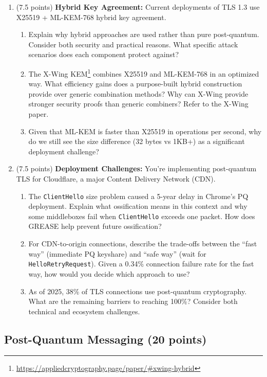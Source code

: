 \documentclass[10pt,a4paper,american]{exam}
\begin{document}
\begin{enumerate}
	\item (7.5 points) \textbf{Hybrid Key Agreement:}
	      Current deployments of TLS 1.3 use X25519 + ML-KEM-768 hybrid key agreement.
	      \begin{enumerate}
		      \item Explain why hybrid approaches are used rather than pure post-quantum. Consider both security and practical reasons. What specific attack scenarios does each component protect against?
		      \item The X-Wing KEM\footnote{\url{https://appliedcryptography.page/paper/\#xwing-hybrid}} combines X25519 and ML-KEM-768 in an optimized way. What efficiency gains does a purpose-built hybrid construction provide over generic combination methods? Why can X-Wing provide stronger security proofs than generic combiners? Refer to the X-Wing paper.
		      \item Given that ML-KEM is faster than X25519 in operations per second, why do we still see the size difference (32 bytes vs 1KB+) as a significant deployment challenge?
	      \end{enumerate}
	\item (7.5 points) \textbf{Deployment Challenges:}
	      You're implementing post-quantum TLS for Cloudflare, a major Content Delivery Network (CDN).
	      \begin{enumerate}
		      \item The \texttt{ClientHello} size problem caused a 5-year delay in Chrome's PQ deployment. Explain what ossification means in this context and why some middleboxes fail when \texttt{ClientHello} exceeds one packet. How does GREASE help prevent future ossification?
		      \item For CDN-to-origin connections, describe the trade-offs between the ``fast way'' (immediate PQ keyshare) and ``safe way'' (wait for \texttt{HelloRetryRequest}). Given a 0.34\% connection failure rate for the fast way, how would you decide which approach to use?
		      \item As of 2025, 38\% of TLS connections use post-quantum cryptography. What are the remaining barriers to reaching 100\%? Consider both technical and ecosystem challenges.
	      \end{enumerate}
\end{enumerate}

\subsection{Post-Quantum Messaging (20 points)}
\end{document}
